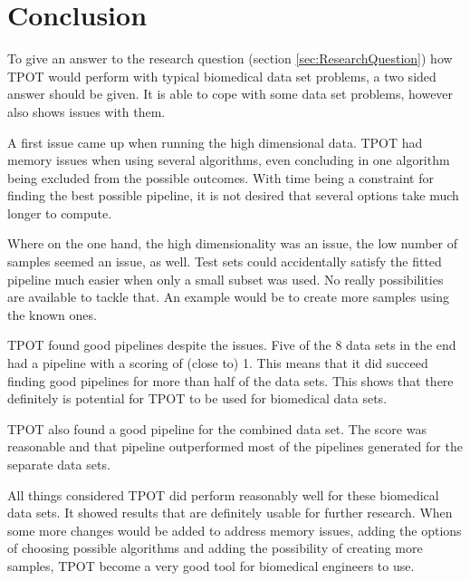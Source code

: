 \documentclass[10pt,a4paper]{article}
\begin{document}
	\section{Conclusion}
	\label{sec:Conclusion}
	
	To give an answer to the research question (section \ref{sec:ResearchQuestion}) how TPOT would perform with typical biomedical data set problems, a two sided answer should be given. It is able to cope with some data set problems, however also shows issues with them.
	
	A first issue came up when running the high dimensional data. TPOT had memory issues when using several algorithms, even concluding in one algorithm being excluded from the possible outcomes. With time being a constraint for finding the best possible pipeline, it is not desired that several options take much longer to compute. 
	
	
	Where on the one hand, the high dimensionality was an issue, the low number of samples seemed an issue, as well. Test sets could accidentally satisfy the fitted pipeline much easier when only a small subset was used. No really possibilities are available to tackle that. An example would be to create more samples using the known ones.
	
	TPOT found good pipelines despite the issues. Five of the 8 data sets in the end had a pipeline with a scoring of (close to) 1. This means that it did succeed finding good pipelines for more than half of the data sets. This shows that there definitely is potential for TPOT to be used for biomedical data sets.
	
	TPOT also found a good pipeline for the combined data set. The score was reasonable and that pipeline outperformed most of the pipelines generated for the separate data sets.
	
	All things considered TPOT did perform reasonably well for these biomedical data sets. It showed results that are definitely usable for further research. When some more changes would be added to address memory issues, adding the options of choosing possible algorithms and adding the possibility of creating more samples, TPOT become a very good tool for biomedical engineers to use.
	
\end{document}
